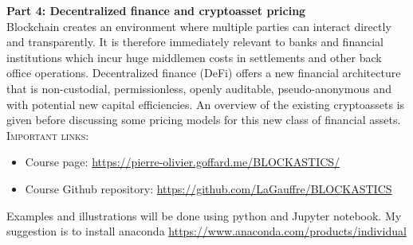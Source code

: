 \documentclass[11pt]{article}
\def\courseWebpage{\href{https://pierre-olivier.goffard.me/BLOCKASTICS/}{https://pierre-olivier.goffard.me/BLOCKASTICS/}}
\def\courseGithubRepo{\href{https://github.com/LaGauffre/BLOCKASTICS}{https://github.com/LaGauffre/BLOCKASTICS}}
\begin{document}
\noindent \textbf{Part 4: Decentralized finance and cryptoasset pricing}\\
\noindent Blockchain creates an environment where multiple parties can interact directly and transparently. It is therefore immediately relevant to banks and financial institutions which incur huge middlemen costs in settlements and other back office operations. Decentralized finance (DeFi) offers a new financial architecture that is non-custodial, permissionless, openly auditable, pseudo-anonymous and with potential new capital efficiencies. An overview of the existing cryptoassets is given before discussing some pricing models for this new class of financial assets. \\


\textsc{Important links:}
\begin{itemize}  
\item Course page: \courseWebpage  
\item Course Github repository: \courseGithubRepo
\end{itemize}
\noindent Examples and illustrations will be done using python and Jupyter notebook. My suggestion is to install anaconda \url{https://www.anaconda.com/products/individual} 

\nocite{*}



\end{document}
